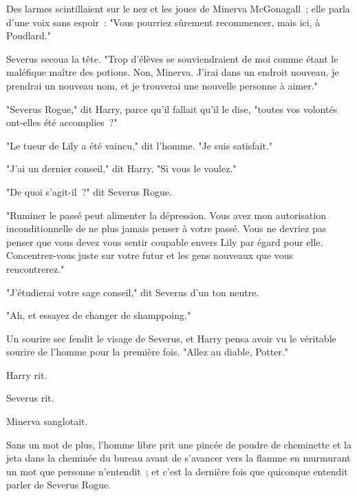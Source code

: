 Des larmes scintillaient sur le nez et les joues de Minerva McGonagall~; elle parla d'une voix sans espoir~: "Vous pourriez sûrement recommencer, mais ici, à Poudlard."

Severus secoua la tête. "Trop d'élèves se souviendraient de moi comme étant le maléfique maître des potions. Non, Minerva. J'irai dans un endroit nouveau, je prendrai un nouveau nom, et je trouverai une nouvelle personne à aimer."

"Severus Rogue," dit Harry, parce qu'il fallait qu'il le dise, "toutes vos volontés ont-elles été accomplies~?"

"Le tueur de Lily a été vaincu," dit l'homme. "Je suis satisfait."

"J'ai un dernier conseil," dit Harry. "Si vous le voulez."

"De quoi s'agit-il~?" dit Severus Rogue.

"Ruminer le passé peut alimenter la dépression. Vous avez mon autorisation inconditionnelle de ne plus jamais penser à votre passé. Vous ne devriez pas penser que vous devez vous sentir coupable envers Lily par égard pour elle. Concentrez-vous juste sur votre futur et les gens nouveaux que vous rencontrerez."

"J'étudierai votre sage conseil," dit Severus d'un ton neutre.

"Ah, et essayez de changer de shamppoing."

Un sourire sec fendit le visage de Severus, et Harry pensa avoir vu le véritable sourire de l'homme pour la première fois. "Allez au diable, Potter."

Harry rit.

Severus rit.

Minerva sanglotait.

Sans un mot de plus, l'homme libre prit une pincée de poudre de cheminette et la jeta dans la cheminée du bureau avant de s'avancer vers la flamme en murmurant un mot que personne n'entendit~; et c'est la dernière fois que quiconque entendit parler de Severus Rogue. 
